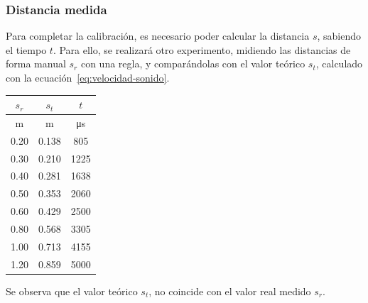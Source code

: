 \documentclass[10pt,a4paper,hidelinks]{article}
\begin{document}
\begin{multicols}{2}
\subsubsection{Distancia medida}

Para completar la calibración, es necesario poder calcular la distancia $s$,
sabiendo el tiempo $t$. Para ello, se realizará otro experimento, midiendo las
distancias de forma manual $s_r$ con una regla, y comparándolas con el valor
teórico $s_t$, calculado con la ecuación~\ref{eq:velocidad-sonido}.

\begin{center}
\begin{tabular}{ | c | c | c | }
\hline
$s_{r}$ & $s_{t}$ & $t$ \\ \hline
m & m & \si{\micro\second} \\ \hline \hline
0.20 & 0.138 &  805 \\ \hline
0.30 & 0.210 & 1225 \\ \hline
0.40 & 0.281 & 1638 \\ \hline
0.50 & 0.353 & 2060 \\ \hline
0.60 & 0.429 & 2500 \\ \hline
0.80 & 0.568 & 3305 \\ \hline
1.00 & 0.713 & 4155 \\ \hline
1.20 & 0.859 & 5000 \\ \hline
\end{tabular}
\end{center}

Se observa que el valor teórico $s_t$, no coincide con el valor real medido 
$s_r$.


\end{multicols}
\end{document}
